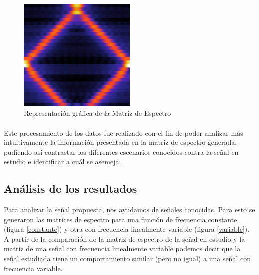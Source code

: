 \documentclass{article}
\begin{document}
	        \begin{figure}[h!]
	            \centering
	            \includegraphics[width=0.5\textwidth]{./Imagenes/Espectrogramas/estudiada.jpg}
	            \caption{Representación gráfica de la Matriz de Espectro}
	            \label{estudiada}
	        \end{figure}
	
	        \paragraph{}

	        \paragraph{}
	        Este procesamiento de los datos fue realizado con el fin de poder analizar más intuitivamente la información presentada en la matriz de espectro generada, 
	        pudiendo así contrastar los diferentes escenarios conocidos contra la señal en estudio e identificar a cuál se asemeja.
	        
	\subsection{Análisis de los resultados}
	        
	        Para analizar la señal propuesta, nos ayudamos de señales conocidas. Para esto se generaron las matrices de espectro para una función de frecuencia constante (figura \ref{constante}) y otra con frecuencia linealmente variable (figura \ref{variable}).
	        A partir de la comparación de la matriz de espectro de la señal en estudio y la matriz de una señal con frecuencia linealmente variable podemos decir que la señal estudiada tiene un comportamiento similar (pero no igual) a una señal con frecuencia variable.
	        
\end{document}
